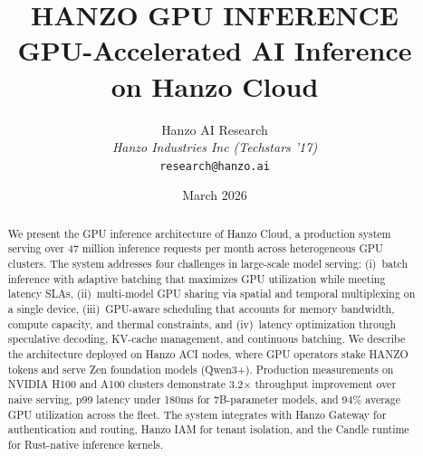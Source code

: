 \documentclass[11pt]{article}
\title{HANZO GPU INFERENCE\\[0.3em]
{\large GPU-Accelerated AI Inference\\on Hanzo Cloud}}
\author{
    Hanzo AI Research \\
    \textit{Hanzo Industries Inc (Techstars '17)} \\
    \texttt{research@hanzo.ai}
}
\date{March 2026}
\begin{document}
\hanzocoverpage

\begin{abstract}
We present the GPU inference architecture of Hanzo Cloud, a production system
serving over 47 million inference requests per month across heterogeneous GPU
clusters. The system addresses four challenges in large-scale model serving:
(i)~batch inference with adaptive batching that maximizes GPU utilization while
meeting latency SLAs, (ii)~multi-model GPU sharing via spatial and temporal
multiplexing on a single device, (iii)~GPU-aware scheduling that accounts for
memory bandwidth, compute capacity, and thermal constraints, and (iv)~latency
optimization through speculative decoding, KV-cache management, and continuous
batching. We describe the architecture deployed on Hanzo ACI nodes, where GPU
operators stake HANZO tokens and serve Zen foundation models (Qwen3+). Production
measurements on NVIDIA H100 and A100 clusters demonstrate 3.2$\times$ throughput
improvement over naive serving, p99 latency under 180ms for 7B-parameter models,
and 94\% average GPU utilization across the fleet. The system integrates with
Hanzo Gateway for authentication and routing, Hanzo IAM for tenant isolation,
and the Candle runtime for Rust-native inference kernels.
\end{abstract}












\end{document}

